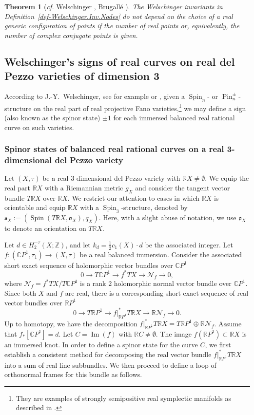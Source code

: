 \documentclass[11pt]{amsart}
\numberwithin{equation}{section}
\theoremstyle{definition}
\theoremstyle{plain}
\newtheorem{theorem}[definition]{Theorem}
\theoremstyle{remark}
\newcommand{\R}{\mathbb{R}}
\newcommand{\Z}{\mathbb{Z}}
\newcommand{\C}{\mathbb{C}}
\DeclareMathOperator{\Pin}{Pin}
\DeclareMathOperator{\Spin}{Spin}
\renewcommand{\Im}{\operatorname{Im}}
\newcommand{\lra}{\longrightarrow}
\begin{document}
\begin{theorem}[\textit{cf.} Welschinger \cite{welschinger2005fourfolds}, Brugall\'e \cite{brugalle2021invariance}]
The Welschinger invariants in Definition~\ref{def-Welschinger.Inv.Nodes} do not depend on the choice of a real generic  configuration of points if the number of real points or, equivalently, the number of complex conjugate points is given.
\end{theorem}

\subsection{Welschinger's signs of  real curves on real del Pezzo varieties of dimension 3}\label{Sect-spinor.dim.3.with.normal.bundle}
According to J.-Y.~Welschinger, see for example \cite[Section 2.2]{welschinger2005spinor} or \cite[Section 1.2]{welschinger2005stongly}, given a $\Spin_n$- or $\Pin^\pm_n$-structure on the real part of real projective Fano varieties,\footnote{They are examples of strongly semipositive real symplectic manifolds as described in \cite{welschinger2005stongly}.} we may define a sign (also known as the spinor state) $\pm 1$ for each immersed balanced real rational curve on such varieties. 



\subsubsection{Spinor states of balanced real rational curves on a real 3-dimensional del Pezzo variety} \label{subsect-Spinor.states}
Let $(X,\tau)$ be a real $3$-dimensional del Pezzo variety with $\R X\neq \emptyset$. We equip the real part $\R X$ with a Riemannian metric $g_X$ and consider the tangent vector bundle $T \R X$ over $\R X$. We restrict our attention to cases in which  $\R X$ is orientable and equip $\R X$ with a $\Spin_3$-structure, denoted by $\mathfrak{s}_X:=(\Spin(T \R X,\mathfrak{o}_X),q_X)$. Here, with a slight abuse of notation, we use  $\mathfrak{o}_X$ to denote an orientation on $T \R X$.

 Let $d \in H_2^{-\tau}(X;\Z)$, and let $k_d=\frac{1}{2}c_1(X)\cdot d$ be the associated integer. Let $f\colon (\C P^1,\tau_1)\to (X,\tau)$ be a real balanced immersion. Consider the associated short exact sequence of holomorphic vector bundles over $\C P^1$ 
 $$0\lra T \C P^1 \lra f^*TX\lra \mathcal{N}_f\lra 0, $$ 
 where $\mathcal{N}_f=f^*TX/T\C P^1$ is a rank $2$ holomorphic normal vector bundle  over $\C P^1$.
 Since both $X$ and $f$ are real, there is a corresponding short exact sequence of real vector bundles over $\R P^1$
$$0\lra T \R P^1 \lra f|_{\R P^1}^*T\R X \lra \R \mathcal{N}_f\lra 0. $$ 
 Up to homotopy,  we have the decomposition  $f|_{\R P^1}^*T\R X = T \R P^1 \oplus \R \mathcal{N}_f$. Assume that $f_*[\C P^1]=d$. 
 Let $C= \Im(f)$ with $\R C \neq \emptyset$. The image  $f(\R P^1) \subset \R X$ is an immersed knot. In order to define a spinor state for the curve $C$, we first establish a consistent method for decomposing the real vector bundle  $f|_{\R P^1}^*T\R X$ into a sum of real line subbundles.  We then proceed to define a loop of orthonormal frames for this bundle as follows. 
\end{document}
